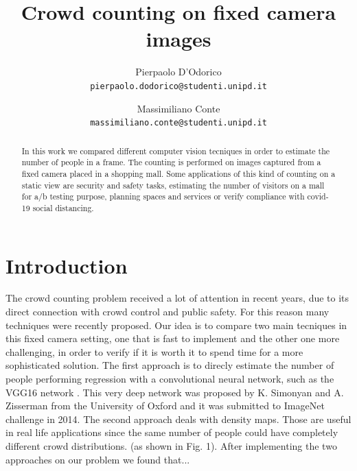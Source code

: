 \documentclass[10pt,twocolumn,letterpaper]{article}
\begin{document}
\title{Crowd counting on fixed camera images}

\author{Pierpaolo D'Odorico\\
{\tt\small pierpaolo.dodorico@studenti.unipd.it}
\and
Massimiliano Conte\\
{\tt\small massimiliano.conte@studenti.unipd.it}
}


\maketitle
\begin{abstract}



In this work we compared different computer vision tecniques in order to estimate the number of people in a frame. The counting is performed on images captured from a fixed camera placed in a shopping mall. Some applications of this kind of counting on a static view are security and safety tasks, estimating the number of visitors on a mall for a/b testing purpose, planning spaces and services or verify compliance with covid-19 social distancing.

\end{abstract}

\section{Introduction}

The crowd counting problem received a lot of attention in recent years, due to its direct connection with crowd control and public safety. For this reason many techniques were recently proposed.
Our idea is to compare two main tecniques in this fixed camera setting, one that is fast to implement and the other one more challenging, in order to verify if it is worth it to spend time for a more sophisticated solution. The first approach is to direcly estimate the number of people performing regression with a convolutional neural network, such as the VGG16 network \cite{simonyan2014very}.  This very deep network was proposed by K. Simonyan and A. Zisserman from the University of Oxford and it was submitted to ImageNet challenge in 2014. The second approach deals with density maps. Those are useful in real life applications since the same number of people could have completely different crowd distributions. (as shown in Fig. 1). After implementing the two approaches on our problem we found that...


\end{document}
